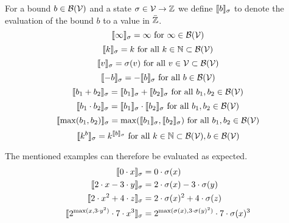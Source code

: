 \begin{definition}
  For a bound $b \in \mathcal{B}(\mathcal{V})$ and a state $\sigma \in \mathcal{V} \rightarrow \mathbb{Z}$ we define $\llbracket b \rrbracket_{\sigma}$ to denote the evaluation of the bound $b$ to a value in $\bar{\mathbb{Z}}$.
  \[ \llbracket \infty \rrbracket_{\sigma} = \infty \text{ for } \infty \in \mathcal{B}(\mathcal{V}) \]
  \[ \llbracket k \rrbracket_{\sigma} = k \text{ for all } k \in \mathbb{N} \subset \mathcal{B}(\mathcal{V}) \] 
  \[ \llbracket v \rrbracket_{\sigma} = \sigma(v) \text{ for all } v \in \mathcal{V} \subset \mathcal{B}(\mathcal{V}) \] 
  \[ \llbracket -b \rrbracket_{\sigma} = -\llbracket b \rrbracket_{\sigma} \text{ for all } b \in \mathcal{B}(\mathcal{V}) \] 
  \[ \llbracket b_1 + b_2 \rrbracket_{\sigma} = \llbracket b_1 \rrbracket_{\sigma} + \llbracket b_2 \rrbracket_{\sigma} \text{ for all } b_1, b_2 \in \mathcal{B}(\mathcal{V}) \] 
  \[ \llbracket b_1 \cdot b_2 \rrbracket_{\sigma} = \llbracket b_1 \rrbracket_{\sigma} \cdot \llbracket b_2 \rrbracket_{\sigma} \text{ for all } b_1, b_2 \in \mathcal{B}(\mathcal{V}) \] 
  \[ \llbracket \max(b_1, b_2) \rrbracket_{\sigma} = \max(\llbracket b_1 \rrbracket_{\sigma}, \llbracket b_2 \rrbracket_{\sigma}) \text{ for all } b_1, b_2 \in \mathcal{B}(\mathcal{V}) \]
  \[ \llbracket k^b \rrbracket_{\sigma} = k^{\llbracket b \rrbracket_{\sigma}} \text{ for all } k \in \mathbb{N} \subset \mathcal{B}(\mathcal{V}), b \in \mathcal{B}(\mathcal{V}) \]  
\end{definition}
The mentioned examples can therefore be evaluated as expected.
\begin{align*}
  \llbracket 0 \cdot x \rrbracket_{\sigma} &= 0 \cdot \sigma(x) \\
  \llbracket 2 \cdot x - 3 \cdot y \rrbracket_{\sigma} &= 2 \cdot \sigma(x) - 3 \cdot \sigma(y) \\
  \llbracket 2 \cdot x^2 + 4 \cdot z \rrbracket_{\sigma} &= 2 \cdot \sigma(x)^2 + 4 \cdot \sigma(z) \\
  \llbracket 2^{\max(x,3 \cdot y^2)} \cdot 7 \cdot x^3 \rrbracket_{\sigma} &= 2^{\max(\sigma(x),3 \cdot \sigma(y)^2)} \cdot 7 \cdot \sigma(x)^3
\end{align*}

